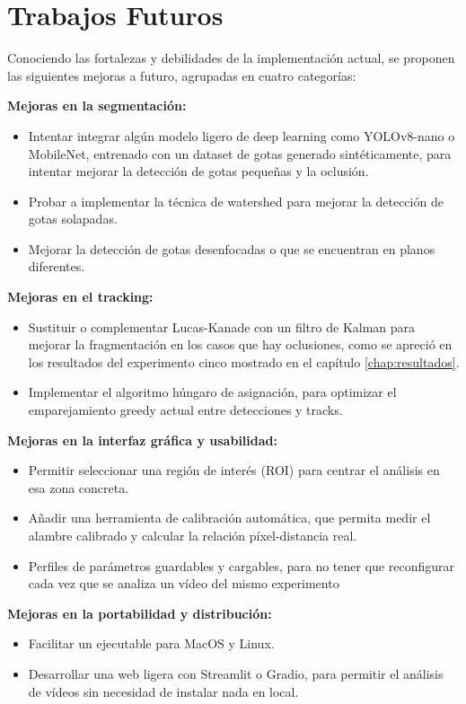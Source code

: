 \section{Trabajos Futuros}

Conociendo las fortalezas y debilidades de la implementación actual, se proponen las siguientes mejoras a futuro, agrupadas en cuatro categorías:

\textbf{Mejoras en la segmentación:}
\begin{itemize}
    \item Intentar integrar algún modelo ligero de deep learning como YOLOv8-nano o MobileNet, entrenado con un dataset de gotas generado sintéticamente, para intentar mejorar la detección de gotas pequeñas y la oclusión.
    \item Probar a implementar la técnica de watershed para mejorar la detección de gotas solapadas.
    \item Mejorar la detección de gotas desenfocadas o que se encuentran en planos diferentes.
\end{itemize}
\textbf{Mejoras en el tracking:}
\begin{itemize}
    \item Sustituir o complementar Lucas-Kanade con un filtro de Kalman para mejorar la fragmentación en los casos que hay oclusiones, como se apreció en los resultados del experimento cinco mostrado en el capítulo \ref{chap:resultados}.
    \item Implementar el algoritmo húngaro de asignación, para optimizar el emparejamiento greedy actual entre detecciones y tracks.
\end{itemize}
\textbf{Mejoras en la interfaz gráfica y usabilidad:}
\begin{itemize}
    \item Permitir seleccionar una región de interés (ROI) para centrar el análisis en esa zona concreta.
    \item Añadir una herramienta de calibración automática, que permita medir el alambre calibrado y calcular la relación píxel-distancia real.
    \item Perfiles de parámetros guardables y cargables, para no tener que reconfigurar cada vez que se analiza un vídeo del mismo experimento
\end{itemize}
\textbf{Mejoras en la portabilidad y distribución:}
\begin{itemize}
    \item Facilitar un ejecutable para MacOS y Linux.
    \item Desarrollar una web ligera con Streamlit o Gradio, para permitir el análisis de vídeos sin necesidad de instalar nada en local.
\end{itemize}

